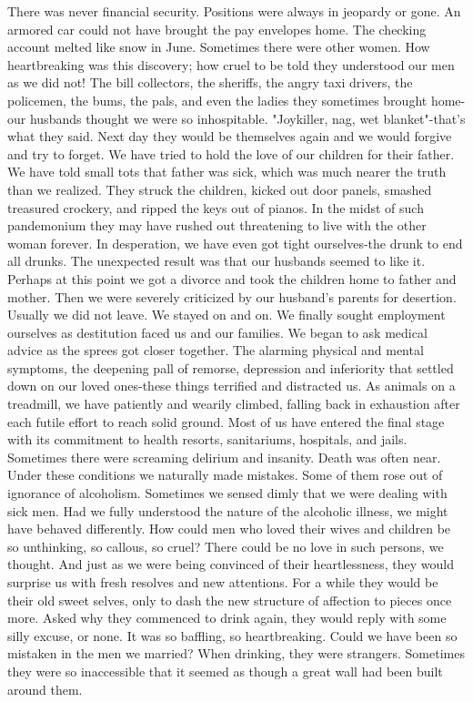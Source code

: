 \begin{biblechapter}
There was never financial security.  Positions were always in jeopardy or gone.  An armored car could  not have brought the pay envelopes home.  The checking account melted like snow in June.
Sometimes there were other women.  How heartbreaking was this discovery; how cruel to be told they understood our men as we did not!
The bill collectors, the sheriffs, the angry taxi drivers, the policemen, the bums, the pals, and even the ladies they sometimes brought home-our husbands thought we were so inhospitable.  "Joykiller, nag, wet blanket"-that's what they said.  Next day they would be themselves again and we would forgive and try to forget.
We have tried to hold the love of our children for their father.  We have told small tots that father was sick, which was much nearer the truth than we realized.  They struck the children, kicked out door panels, smashed treasured crockery, and ripped the keys out of pianos.  In the midst of such pandemonium they may have rushed out threatening to live with the other woman forever.  In desperation, we have even got tight ourselves-the drunk to end all drunks.  The unexpected result was that our husbands seemed to like it.
Perhaps at this point we got a divorce and took the children home to father and mother.  Then we were severely criticized by our husband's parents for desertion.  Usually we did not leave.  We stayed on and on.  We finally sought employment ourselves as destitution faced us and our families.
We began to ask medical advice as the sprees got closer together.  The alarming physical and mental symptoms, the deepening pall of remorse, depression and inferiority that settled down on our loved ones-these things terrified and distracted us.  As animals on a treadmill, we have patiently and wearily climbed, falling back in exhaustion after each futile effort to reach solid ground.  Most of us have entered the final stage with its commitment to health resorts, sanitariums, hospitals, and jails.  Sometimes there were screaming delirium and insanity.  Death was often near.
Under these conditions we naturally made mistakes.  Some of them rose out of ignorance of alcoholism.  Sometimes we sensed dimly that we were dealing with sick men.  Had we fully understood the nature of the alcoholic illness, we might have behaved differently.
How could men who loved their wives and children be so unthinking, so callous, so cruel?  There could be no love in such persons, we thought.  And just as we were being convinced of their heartlessness, they would surprise us with fresh resolves and new attentions.  For a while they would be their old sweet selves, only to dash the new structure of affection to pieces once more.  Asked why they commenced to drink again, they would reply with some silly excuse, or none.  It was so baffling, so heartbreaking.  Could we have been so mistaken in the men we married?  When drinking, they were strangers.  Sometimes they were so inaccessible that it seemed as though a great wall had been built around them.

\end{biblechapter}
